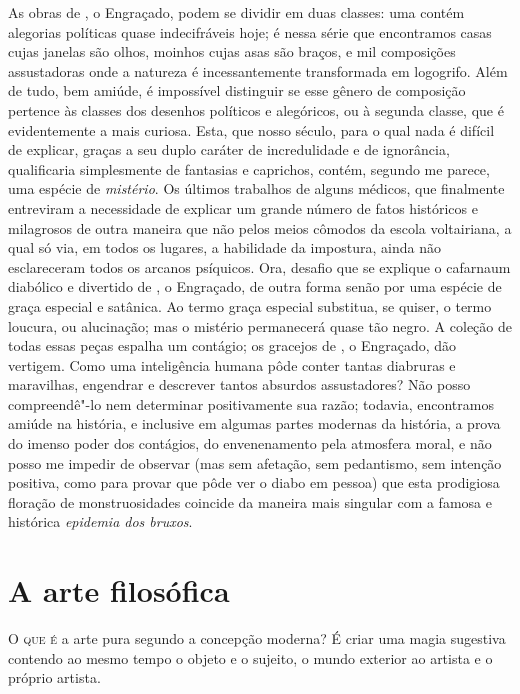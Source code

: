As obras de , o Engraçado, podem se dividir em duas classes: uma
contém alegorias políticas quase indecifráveis hoje; é nessa série que
encontramos casas cujas janelas são olhos, moinhos cujas asas são
braços, e mil composições assustadoras onde a natureza é
incessantemente transformada em logogrifo. Além de tudo, bem amiúde, é
impossível distinguir se esse gênero de composição pertence às classes
dos desenhos políticos e alegóricos, ou à segunda classe, que é
evidentemente a mais curiosa. Esta, que nosso século, para o qual nada
é difícil de explicar, graças a seu duplo caráter de incredulidade e de
ignorância, qualificaria simplesmente de fantasias e caprichos, contém,
segundo me parece, uma espécie de \textit{mistério}. Os últimos
trabalhos de alguns médicos, que finalmente entreviram a necessidade de
explicar um grande número de fatos históricos e milagrosos de outra
maneira que não pelos meios cômodos da escola voltairiana, a qual só
via, em todos os lugares, a habilidade da impostura, ainda não
esclareceram todos os arcanos psíquicos. Ora, desafio que se explique o
cafarnaum diabólico e divertido de , o Engraçado, de outra
forma senão por uma espécie de graça especial e satânica. Ao termo
graça especial substitua, se quiser, o termo loucura, ou alucinação;
mas o mistério permanecerá quase tão negro. A coleção de todas essas
peças espalha um contágio; os gracejos de , o Engraçado, dão
vertigem. Como uma inteligência humana pôde conter tantas diabruras e
maravilhas, engendrar e descrever tantos absurdos assustadores? Não
posso compreendê"-lo nem determinar positivamente sua razão; todavia,
encontramos amiúde na história, e inclusive em algumas partes modernas
da história, a prova do imenso poder dos contágios, do envenenamento
pela atmosfera moral, e não posso me impedir de observar (mas sem
afetação, sem pedantismo, sem intenção positiva, como para provar que
 pôde ver o diabo em pessoa) que esta prodigiosa floração de
monstruosidades coincide da maneira mais singular com a famosa e
histórica \textit{epidemia dos bruxos}.

\chapter{A arte filosófica}

\noindent\textsc{O que é} a arte pura segundo a concepção moderna? É criar uma magia
sugestiva contendo ao mesmo tempo o objeto e o sujeito, o mundo
exterior ao artista e o próprio artista.

